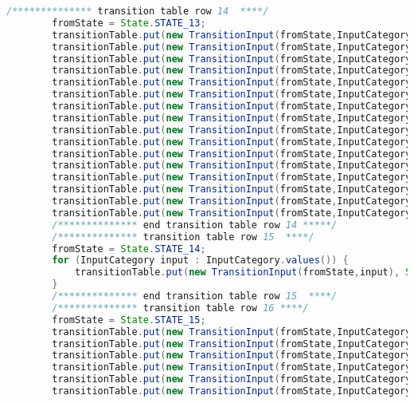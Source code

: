 \begin{lstlisting}[basicstyle=\miniscule,language=Java,caption=Implementation of transition table,label=listing:transition table]
		/************** transition table row 14  ****/
		fromState = State.STATE_13;
		transitionTable.put(new TransitionInput(fromState,InputCategory.LETTER), State.STATE_ERROR);
		transitionTable.put(new TransitionInput(fromState,InputCategory.DIGIT), fromState);
		transitionTable.put(new TransitionInput(fromState,InputCategory.UNDERSCORE), State.STATE_ERROR);
		transitionTable.put(new TransitionInput(fromState,InputCategory.SLASH_DIVIDE), State.STATE_ERROR);
		transitionTable.put(new TransitionInput(fromState,InputCategory.ASTERISK), State.STATE_ERROR);
		transitionTable.put(new TransitionInput(fromState,InputCategory.LESS_THAN), State.STATE_ERROR);
		transitionTable.put(new TransitionInput(fromState,InputCategory.GREATER_THAN), State.STATE_ERROR);
		transitionTable.put(new TransitionInput(fromState,InputCategory.PLUS), State.STATE_ERROR);
		transitionTable.put(new TransitionInput(fromState,InputCategory.HYPHEN_MINUS), State.STATE_ERROR);
		transitionTable.put(new TransitionInput(fromState,InputCategory.EQUAL), State.STATE_ERROR);
		transitionTable.put(new TransitionInput(fromState,InputCategory.EXCLAMATION_MARK), State.STATE_ERROR);
		transitionTable.put(new TransitionInput(fromState,InputCategory.DOT), State.STATE_ERROR);
		transitionTable.put(new TransitionInput(fromState,InputCategory.SINGLE_QUOTE), State.STATE_ERROR);
		transitionTable.put(new TransitionInput(fromState,InputCategory.PUNCT), State.STATE_ERROR);
		transitionTable.put(new TransitionInput(fromState,InputCategory.OTHER_PRINTABLE), State.STATE_ERROR);
		transitionTable.put(new TransitionInput(fromState,InputCategory.LINE_FEED), State.STATE_ERROR);
		/************** end transition table row 14 *****/
		/************** transition table row 15  ****/
		fromState = State.STATE_14;
		for (InputCategory input : InputCategory.values()) {
			transitionTable.put(new TransitionInput(fromState,input), State.STATE_ERROR);
		}
		/************** end transition table row 15  ****/
		/************** transition table row 16 ****/
		fromState = State.STATE_15;
		transitionTable.put(new TransitionInput(fromState,InputCategory.LETTER), State.STATE_ERROR);
		transitionTable.put(new TransitionInput(fromState,InputCategory.DIGIT), State.STATE_ERROR);
		transitionTable.put(new TransitionInput(fromState,InputCategory.UNDERSCORE), State.STATE_ERROR);
		transitionTable.put(new TransitionInput(fromState,InputCategory.SLASH_DIVIDE), State.STATE_ERROR);
		transitionTable.put(new TransitionInput(fromState,InputCategory.ASTERISK), State.STATE_ERROR);
		transitionTable.put(new TransitionInput(fromState,InputCategory.LESS_THAN), State.STATE_ERROR);

\end{lstlisting}

